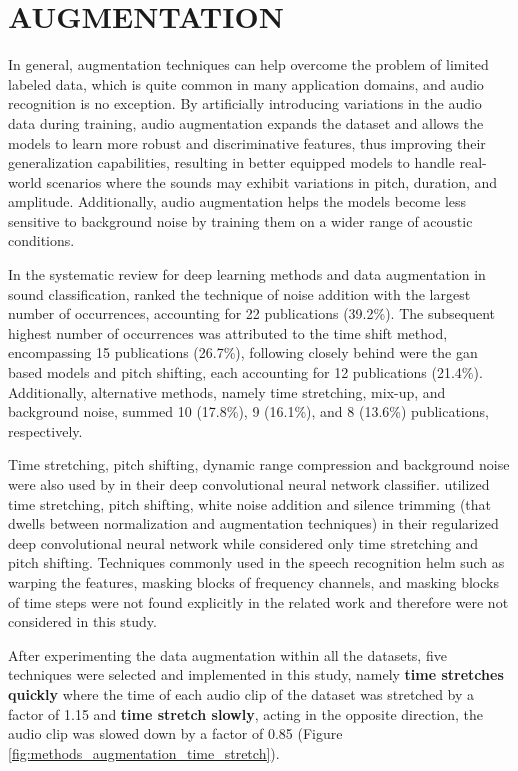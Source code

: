 \section{AUGMENTATION}
\label{sec:methods_augmentation}

In general, augmentation techniques can help overcome the problem of limited labeled data, which is quite common in many application domains, and audio recognition is no exception. By artificially introducing variations in the audio data during training, audio augmentation expands the dataset and allows the models to learn more robust and discriminative features, thus improving their generalization capabilities, resulting in better equipped models to handle real-world scenarios where the sounds may exhibit variations in pitch, duration, and amplitude. Additionally, audio augmentation helps the models become less sensitive to background noise by training them on a wider range of acoustic conditions.

In the systematic review for deep learning methods and data augmentation in sound classification, \textcite{Alli2022} ranked the technique of noise addition with the largest number of occurrences, accounting for 22 publications (39.2\%). The subsequent highest number of occurrences was attributed to the time shift method, encompassing 15 publications (26.7\%), following closely behind were the \gls{gan} based models and pitch shifting, each accounting for 12 publications (21.4\%). Additionally, alternative methods, namely time stretching, mix-up, and background noise, summed 10 (17.8\%), 9 (16.1\%), and 8 (13.6\%) publications, respectively. 

 Time stretching, pitch shifting, dynamic range compression and background noise were also used by \textcite{Salamon2017} in their deep convolutional neural network classifier. \textcite{Mushtaq2020b} utilized time stretching, pitch shifting, white noise addition and silence trimming (that dwells between normalization and augmentation techniques) in their regularized deep convolutional neural network while \textcite{Bountourakis2019} considered only time stretching and pitch shifting. Techniques commonly used in the speech recognition helm such as warping the features, masking blocks of frequency channels, and masking blocks of time steps \cite{Park2019} were not found explicitly in the related work and therefore were not considered in this study.

After experimenting the data augmentation within all the datasets, five techniques were selected and implemented in this study, namely \textbf{time stretches quickly} where the time of each audio clip of the dataset was stretched by a factor of 1.15 and \textbf{time stretch slowly}, acting in the opposite direction, the audio clip was slowed down by a factor of 0.85 (Figure \ref{fig:methods_augmentation_time_stretch}).


